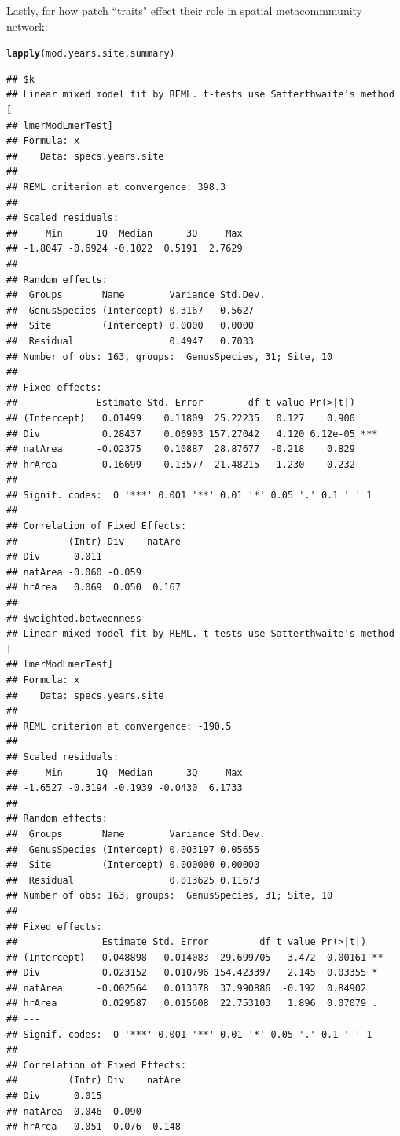\documentclass{article}\usepackage[]{graphicx}\usepackage[]{color}
\makeatletter
\newcommand{\hlstd}[1]{\textcolor[rgb]{0.345,0.345,0.345}{#1}}%
\newcommand{\hlkwd}[1]{\textcolor[rgb]{0.737,0.353,0.396}{\textbf{#1}}}%
\newenvironment{kframe}{%
 \def\at@end@of@kframe{}%
 \ifinner\ifhmode%
  \def\at@end@of@kframe{\end{minipage}}%
  \begin{minipage}{\columnwidth}%
 \fi\fi%
 \def\FrameCommand##1{\hskip\@totalleftmargin \hskip-\fboxsep
 \colorbox{shadecolor}{##1}\hskip-\fboxsep
     \hskip-\linewidth \hskip-\@totalleftmargin \hskip\columnwidth}%
 \MakeFramed {\advance\hsize-\width
   \@totalleftmargin\z@ \linewidth\hsize
   \@setminipage}}%
 {\par\unskip\endMakeFramed%
 \at@end@of@kframe}
\newenvironment{knitrout}{}{} %
\makeatother
\begin{document}
Lastly, for how patch ``traits" effect their role in spatial  metacommmunity network: 
\begin{knitrout}
\color{fgcolor}\begin{kframe}
\begin{alltt}
\hlkwd{lapply}\hlstd{(mod.years.site, summary)}
\end{alltt}
\begin{verbatim}
## $k
## Linear mixed model fit by REML. t-tests use Satterthwaite's method [
## lmerModLmerTest]
## Formula: x
##    Data: specs.years.site
## 
## REML criterion at convergence: 398.3
## 
## Scaled residuals: 
##     Min      1Q  Median      3Q     Max 
## -1.8047 -0.6924 -0.1022  0.5191  2.7629 
## 
## Random effects:
##  Groups       Name        Variance Std.Dev.
##  GenusSpecies (Intercept) 0.3167   0.5627  
##  Site         (Intercept) 0.0000   0.0000  
##  Residual                 0.4947   0.7033  
## Number of obs: 163, groups:  GenusSpecies, 31; Site, 10
## 
## Fixed effects:
##              Estimate Std. Error        df t value Pr(>|t|)    
## (Intercept)   0.01499    0.11809  25.22235   0.127    0.900    
## Div           0.28437    0.06903 157.27042   4.120 6.12e-05 ***
## natArea      -0.02375    0.10887  28.87677  -0.218    0.829    
## hrArea        0.16699    0.13577  21.48215   1.230    0.232    
## ---
## Signif. codes:  0 '***' 0.001 '**' 0.01 '*' 0.05 '.' 0.1 ' ' 1
## 
## Correlation of Fixed Effects:
##         (Intr) Div    natAre
## Div      0.011              
## natArea -0.060 -0.059       
## hrArea   0.069  0.050  0.167
## 
## $weighted.betweenness
## Linear mixed model fit by REML. t-tests use Satterthwaite's method [
## lmerModLmerTest]
## Formula: x
##    Data: specs.years.site
## 
## REML criterion at convergence: -190.5
## 
## Scaled residuals: 
##     Min      1Q  Median      3Q     Max 
## -1.6527 -0.3194 -0.1939 -0.0430  6.1733 
## 
## Random effects:
##  Groups       Name        Variance Std.Dev.
##  GenusSpecies (Intercept) 0.003197 0.05655 
##  Site         (Intercept) 0.000000 0.00000 
##  Residual                 0.013625 0.11673 
## Number of obs: 163, groups:  GenusSpecies, 31; Site, 10
## 
## Fixed effects:
##               Estimate Std. Error         df t value Pr(>|t|)   
## (Intercept)   0.048898   0.014083  29.699705   3.472  0.00161 **
## Div           0.023152   0.010796 154.423397   2.145  0.03355 * 
## natArea      -0.002564   0.013378  37.990886  -0.192  0.84902   
## hrArea        0.029587   0.015608  22.753103   1.896  0.07079 . 
## ---
## Signif. codes:  0 '***' 0.001 '**' 0.01 '*' 0.05 '.' 0.1 ' ' 1
## 
## Correlation of Fixed Effects:
##         (Intr) Div    natAre
## Div      0.015              
## natArea -0.046 -0.090       
## hrArea   0.051  0.076  0.148
\end{verbatim}
\end{kframe}
\end{knitrout}
\end{document}
